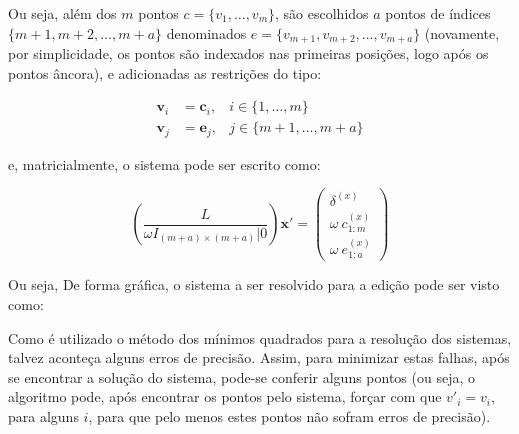 Ou seja, além dos $m$ pontos $c = \{v_1, \dots, v_m\}$, são escolhidos $a$ pontos de índices $\{m+1, m+2, \dots, m+a\}$ denominados $e = \{v_{m+1}, v_{m+2}, \dots, v_{m+a}\}$ (novamente, por simplicidade, os pontos são indexados nas primeiras posições, logo após os pontos âncora), e adicionadas as restrições do tipo:

\begin{align}
\mathbf{v}_i &= \mathbf{c}_i, &i \in \{1, \dots, m\}\\
\mathbf{v}_j &= \mathbf{e}_j, &j \in \{m+1, \dots, m+a\}
\end{align}

\noindent e, matricialmente, o sistema pode ser escrito como:

\begin{equation}\label{eq:sisrecoveredi}
\left( \frac{L}{\omega I_{(m+a) \times (m+a)} | 0} \right) \mathbf{x'} = \begin{pmatrix}
\delta^{(x)}\\
\omega\ c_{1:m}^{(x)}\\
\omega\ e_{1:a}^{(x)}
\end{pmatrix}
\end{equation}

Ou seja, De forma gráfica, o sistema a ser resolvido para a edição pode ser visto como:

\begin{center}
\end{center}

Como é utilizado o método dos mínimos quadrados para a resolução dos sistemas, talvez aconteça alguns erros de precisão. Assim, para minimizar estas falhas, após se encontrar a solução do sistema, pode-se conferir alguns pontos (ou seja, o algoritmo pode, após encontrar os pontos pelo sistema, forçar com que $v'_i = v_i$, para alguns $i$, para que pelo menos estes pontos não sofram erros de precisão).

